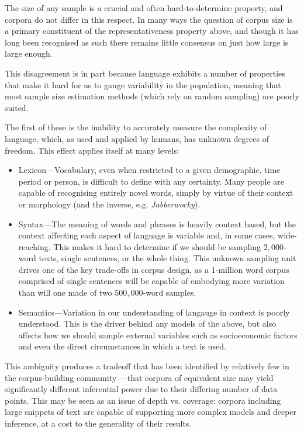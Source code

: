 The size of any sample is a crucial and often hard-to-determine property, and corpora do not differ in this respect.  In many ways the question of corpus size is a primary constituent of the representativeness property above, and though it has long been recognised as such there remains little consensus on just how large is large enough.

This disagreement is in part because language exhibits a number of properties that make it hard for us to gauge variability in the population, meaning that most sample size estimation methods (which rely on random sampling) are poorly suited.


The first of these is the inability to accurately measure the complexity of language, which, as used and applied by humans, has unknown degrees of freedom.  This effect applies itself at many levels:

\begin{itemize}
    \item Lexicon---Vocabulary, even when restricted to a given demographic, time period or person, is difficult to define with any certainty.  Many people are capable of recognising entirely novel words, simply by virtue of their context or morphology (and the inverse, e.g. \textsl{Jabberwocky}).
    \item Syntax---The meaning of words and phrases is heavily context based, but the context affecting each aspect of language is variable and, in some cases, wide-reaching.  This makes it hard to determine if we should be sampling $2,000$-word texts, single sentences, or the whole thing\cite{hoey2005lexical}.  This unknown sampling unit drives one of the key trade-offs in corpus design, as a 1-million word corpus comprised of single sentences will be capable of embodying more variation than will one made of two $500,000$-word samples.
    \item Semantics---Variation in our understanding of langauge in context is poorly understood.  This is the driver behind any models of the above, but also affects how we should sample external variables such as socioeconomic factors and even the direct circumstances in which a text is used\cite{sinclair1991corpus,Stubbs19950101T0000000929998X23}. %
\end{itemize}

This ambiguity produces a tradeoff that has been identified by relatively few in the corpus-building community\cite{evert2006random,kilgarriff2005language,gries2011corpus}%
---that corpora of equivalent size may yield significantly different inferential power due to their differing number of data points.  This may be seen as an issue of depth vs. coverage: corpora including large snippets of text are capable of supporting more complex models and deeper inference, at a cost to the generality of their results.

